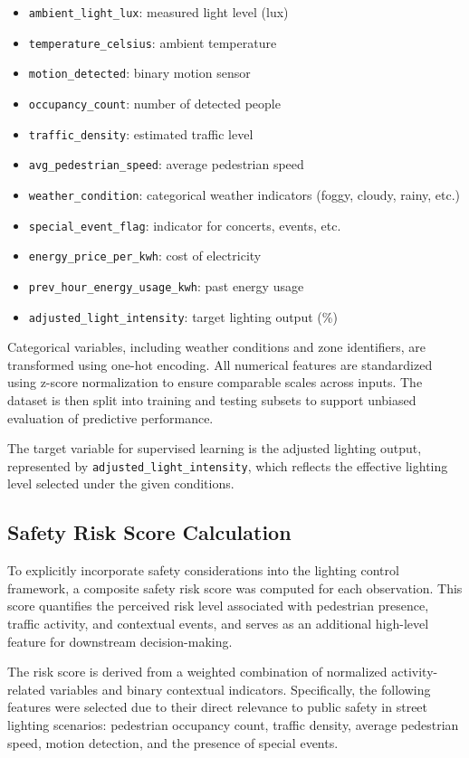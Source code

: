 \documentclass[conference]{IEEEtran}
\begin{document}
\begin{itemize}
    \item \texttt{ambient\_light\_lux}: measured light level (lux)
    \item \texttt{temperature\_celsius}: ambient temperature
    \item \texttt{motion\_detected}: binary motion sensor
    \item \texttt{occupancy\_count}: number of detected people
    \item \texttt{traffic\_density}: estimated traffic level
    \item \texttt{avg\_pedestrian\_speed}: average pedestrian speed
    \item \texttt{weather\_condition}: categorical weather indicators (foggy, cloudy, rainy, etc.)
    \item \texttt{special\_event\_flag}: indicator for concerts, events, etc.
    \item \texttt{energy\_price\_per\_kwh}: cost of electricity
    \item \texttt{prev\_hour\_energy\_usage\_kwh}: past energy usage
    \item \texttt{adjusted\_light\_intensity}: target lighting output (\%)
\end{itemize}

Categorical variables, including weather conditions and zone identifiers, are transformed using one-hot encoding. All numerical features are standardized using z-score normalization to ensure comparable scales across inputs. The dataset is then split into training and testing subsets to support unbiased evaluation of predictive performance.

The target variable for supervised learning is the adjusted lighting output, represented by \texttt{adjusted\_light\_intensity}, which reflects the effective lighting level selected under the given conditions.

\subsection{Safety Risk Score Calculation}
To explicitly incorporate safety considerations into the lighting control framework, a composite safety risk score was computed for each observation. This score quantifies the perceived risk level associated with pedestrian presence, traffic activity, and contextual events, and serves as an additional high-level feature for downstream decision-making.

The risk score is derived from a weighted combination of normalized activity-related variables and binary contextual indicators. Specifically, the following features were selected due to their direct relevance to public safety in street lighting scenarios: pedestrian occupancy count, traffic density, average pedestrian speed, motion detection, and the presence of special events.
\end{document}
